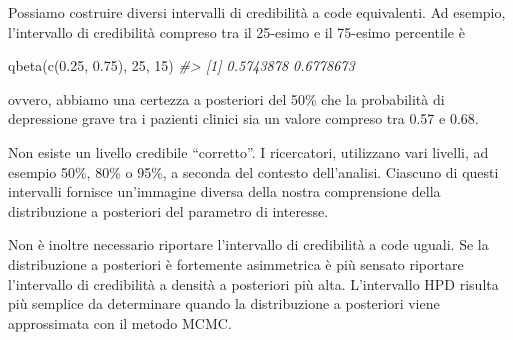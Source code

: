\documentclass[
  11pt,
  italian,
  a4paper,
  extrafontsizes,onecolumn,openright
  ]{memoir}
\newenvironment{Shaded}{\begin{snugshade}}{\end{snugshade}}
\newcommand{\AttributeTok}[1]{\textcolor[rgb]{0.77,0.63,0.00}{#1}}
\newcommand{\CommentTok}[1]{\textcolor[rgb]{0.56,0.35,0.01}{\textit{#1}}}
\newcommand{\ControlFlowTok}[1]{\textcolor[rgb]{0.13,0.29,0.53}{\textbf{#1}}}
\newcommand{\DecValTok}[1]{\textcolor[rgb]{0.00,0.00,0.81}{#1}}
\newcommand{\FloatTok}[1]{\textcolor[rgb]{0.00,0.00,0.81}{#1}}
\newcommand{\FunctionTok}[1]{\textcolor[rgb]{0.00,0.00,0.00}{#1}}
\newcommand{\NormalTok}[1]{#1}
\newcommand{\OtherTok}[1]{\textcolor[rgb]{0.56,0.35,0.01}{#1}}
\newcommand{\SpecialCharTok}[1]{\textcolor[rgb]{0.00,0.00,0.00}{#1}}
\begin{document}
\begin{Shaded}
\end{Shaded}

Possiamo costruire diversi intervalli di credibilità a code equivalenti. Ad esempio, l'intervallo di credibilità compreso tra il 25-esimo e il 75-esimo percentile è

\begin{Shaded}
\begin{Highlighting}[]
\FunctionTok{qbeta}\NormalTok{(}\FunctionTok{c}\NormalTok{(}\FloatTok{0.25}\NormalTok{, }\FloatTok{0.75}\NormalTok{), }\DecValTok{25}\NormalTok{, }\DecValTok{15}\NormalTok{)}
\CommentTok{\#\textgreater{} [1] 0.5743878 0.6778673}
\end{Highlighting}
\end{Shaded}

\noindent
ovvero, abbiamo una certezza a posteriori del 50\% che la probabilità di depressione grave tra i pazienti clinici sia un valore compreso tra 0.57 e 0.68.

Non esiste un livello credibile ``corretto''. I ricercatori, utilizzano vari livelli, ad esempio 50\%, 80\% o 95\%, a seconda del contesto dell'analisi. Ciascuno di questi intervalli fornisce un'immagine diversa della nostra comprensione della distribuzione a posteriori del parametro di interesse.

Non è inoltre necessario riportare l'intervallo di credibilità a code uguali. Se la distribuzione a posteriori è fortemente asimmetrica è più sensato riportare l'intervallo di credibilità a densità a posteriori più alta.
L'intervallo HPD risulta più semplice da determinare quando la distribuzione a posteriori viene approssimata con il metodo MCMC.
\end{document}
